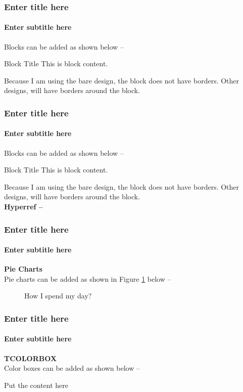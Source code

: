 \documentclass[11pt]{beamer}
\begin{document}
\begin{frame}
\frametitle{Enter title here}
\framesubtitle{Enter subtitle here}

Blocks can be added as shown below --

\begin{block}{Block Title}
This is block content.
\end{block}
Because I am using the bare design, the block does not have borders. Other designs, will have borders around the block.
\end{frame}

\begin{frame}
\frametitle{Enter title here}
\framesubtitle{Enter subtitle here}

Blocks can be added as shown below --

\begin{block}{Block Title}
This is block content.
\end{block}
Because I am using the bare design, the block does not have borders. Other designs, will have borders around the block. \\

\textbf{Hyperref --}
\hyperlink{inline-comment}{}

\end{frame}

\begin{frame}
\frametitle{Enter title here}
\framesubtitle{Enter subtitle here}

\textbf{Pie Charts} \\

Pie charts can be added as shown in Figure \ref{pie-chart} below --

\begin{figure}[ht!]
\centering
{}
\caption{How I spend my day?}
\label{pie-chart}
\end{figure}

\end{frame}

\begin{frame}
\frametitle{Enter title here}
\framesubtitle{Enter subtitle here}

\textbf{TCOLORBOX} \\

Color boxes can be added as shown below --

\begin{tcolorbox}[colback=red!5,colframe=blue!40!black,title=Put the title here]
Put the content here
\end{tcolorbox}

\end{frame}
\end{document}
